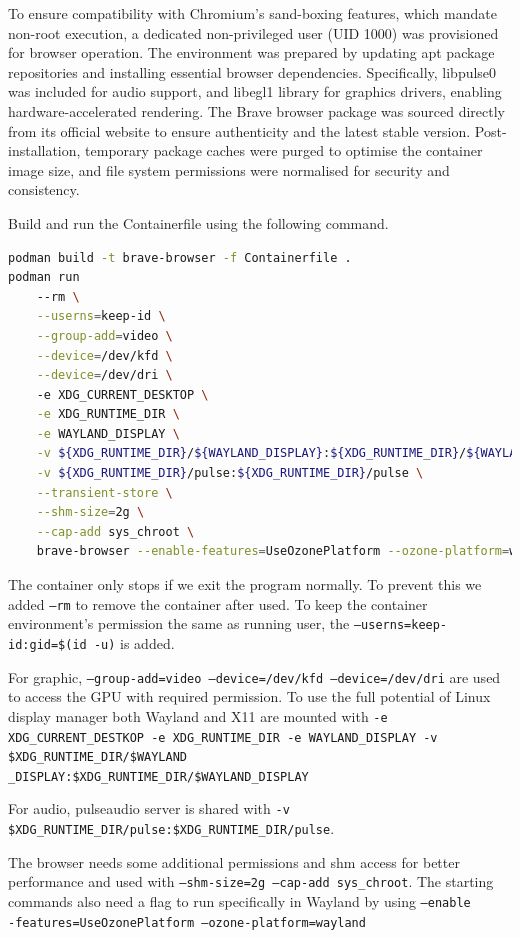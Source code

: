 \documentclass[journal,onecolumn]{IEEEtran}
\newcommand{\code}[1]{\texttt{#1}}
\begin{document}
 To ensure compatibility with Chromium's sand-boxing features, which mandate non-root execution, a dedicated non-privileged user (UID 1000) was provisioned for browser operation. The environment was prepared by updating apt package repositories and installing essential browser dependencies. Specifically, libpulse0 was included for audio support, and libegl1 library for graphics drivers, enabling hardware-accelerated rendering. The Brave browser package was sourced directly from its official website to ensure authenticity and the latest stable version. Post-installation, temporary package caches were purged to optimise the container image size, and file system permissions were normalised for security and consistency.

Build and run the Containerfile using the following command.
\begin{lstlisting}[language=Bash]
podman build -t brave-browser -f Containerfile .
podman run 
    --rm \
    --userns=keep-id \
    --group-add=video \
    --device=/dev/kfd \
    --device=/dev/dri \ 
    -e XDG_CURRENT_DESKTOP \
    -e XDG_RUNTIME_DIR \
    -e WAYLAND_DISPLAY \
    -v ${XDG_RUNTIME_DIR}/${WAYLAND_DISPLAY}:${XDG_RUNTIME_DIR}/${WAYLAND_DISPLAY} \
    -v ${XDG_RUNTIME_DIR}/pulse:${XDG_RUNTIME_DIR}/pulse \
    --transient-store \
    --shm-size=2g \
    --cap-add sys_chroot \
    brave-browser --enable-features=UseOzonePlatform --ozone-platform=wayland
\end{lstlisting}

The container only stops if we exit the program normally. To prevent this we added \code{--rm} to remove the container after used. To keep the container environment's permission the same as running user, the \code{--userns=keep-id:gid=\$(id -u)} is added.

For graphic, \code{--group-add=video --device=/dev/kfd --device=/dev/dri} are used to access the GPU with required permission. To use the full potential of Linux display manager both Wayland and X11 are mounted with \code{-e XDG\_CURRENT\_DESTKOP -e XDG\_RUNTIME\_DIR -e WAYLAND\_DISPLAY -v \${XDG\_RUNTIME\_DIR}/\${WAYLAND\\\_DISPLAY}:\${XDG\_RUNTIME\_DIR}/\${WAYLAND\_DISPLAY}}

For audio, pulseaudio server is shared with \code{-v \${XDG\_RUNTIME\_DIR}/pulse:\${XDG\_RUNTIME\_DIR}/pulse}.

The browser needs some additional permissions and shm access for better performance and used with \code{--shm-size=2g --cap-add sys\_chroot}. The starting commands also need a flag to run specifically in Wayland by using \code{--enable\\-features=UseOzonePlatform --ozone-platform=wayland}
\end{document}
